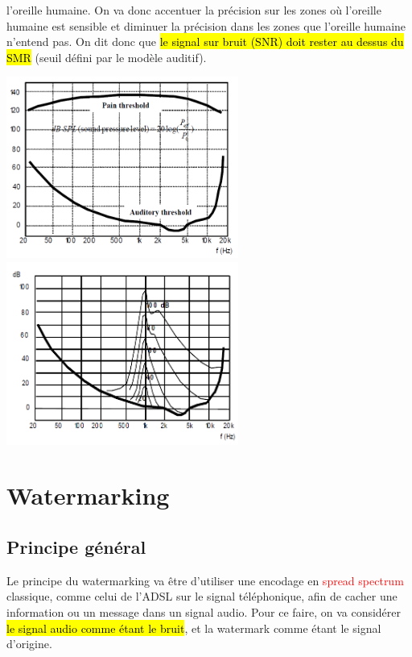 \documentclass[letterpaper, 12pt]{article}
\newcommand{\alinea}{
\hspace*{0.5cm}}
\newcommand{\red}[1]{
	\textcolor{red}{#1}}
\begin{document}
				l'oreille humaine. On va donc accentuer la précision sur les zones où l'oreille humaine est sensible et
				diminuer la précision dans les zones que l'oreille humaine n'entend pas. On dit donc que \hl{le signal sur bruit (SNR)
				doit rester au dessus du SMR} (seuil défini par le modèle auditif).
			\begin{center}
				\includegraphics[width=3in]{Images/perceptual1} \hfill \includegraphics[width=3in]{Images/perceptual2}
			\end{center}
	\section{Watermarking}
		\subsection{Principe général}	
			\alinea Le principe du watermarking va être d'utiliser une encodage en \red{spread spectrum} classique, comme celui de l'ADSL 
				sur le signal téléphonique, afin de cacher une information ou un message dans un signal audio. Pour ce faire,
				on va considérer \hl{le signal audio comme étant le bruit}, et la watermark comme étant le signal d'origine.
\end{document}
